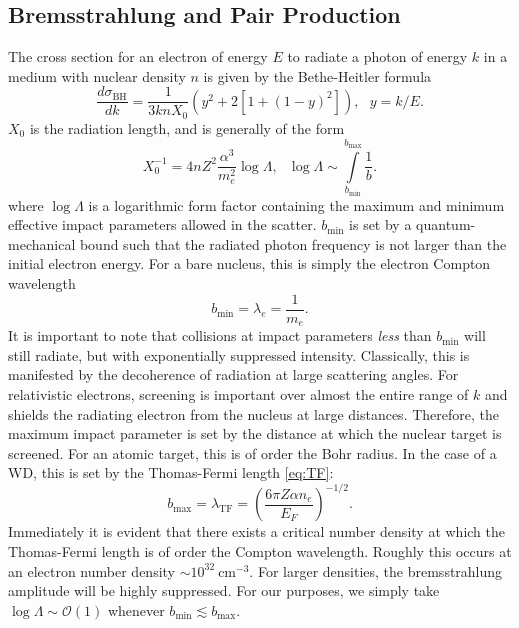 \documentclass[twocolumn,showpacs,preprintnumbers,amsmath,amssymb,prd]{revtex4}
\newcommand{\OO}{\mathcal{O}}
\def\r{\right)}
\def\l{\left(}
\begin{document}
\begin{appendices}
\subsection*{Bremsstrahlung and Pair Production}
The cross section for an electron of energy $E$ to radiate a photon of energy $k$ in a medium with nuclear density $n$ is given by the Bethe-Heitler formula
\begin{equation}
\label{eq:BH}
\frac{d \sigma_\text{BH}}{dk} = \frac{1}{3 k n X_0} (y^2+2 [1+ (1-y)^2]), ~~~ y = k/E.
\end{equation}
$X_0$ is the radiation length, and is generally of the form
\begin{equation}
X_0^{-1} = 4 n Z^2 \frac{\alpha^3}{m_e^2} \log{\Lambda}, ~~~ \log{\Lambda} \sim \int \limits_{b_\text{min}}^{b_\text{max}} \frac{1}{b}. 
\end{equation}
where $\log{\Lambda}$ is a logarithmic form factor containing the maximum and minimum effective impact parameters allowed in the scatter. $b_\text{min}$ is set by a quantum-mechanical bound such that the radiated photon frequency is not larger than the initial electron energy. For a bare nucleus, this is simply the electron Compton wavelength 
\begin{equation}
b_\text{min} = \lambda_e = \frac{1}{m_e}. 
\end{equation}
It is important to note that collisions at impact parameters \emph{less} than $b_\text{min}$ will still radiate, but with exponentially suppressed intensity. Classically, this is manifested by the decoherence of radiation at large scattering angles. For relativistic electrons, screening is important over almost the entire range of $k$ and shields the radiating electron from the nucleus at large distances. Therefore, the maximum impact parameter is set by the distance at which the nuclear target is screened. For an atomic target, this is of order the Bohr radius. In the case of a WD, this is set by the Thomas-Fermi length \eqref{eq:TF}:
\begin{equation}
b_\text{max} = \lambda_\text{TF} = \l \frac{6 \pi Z \alpha n_e}{E_F}\r^{-1/2}.
\end{equation}
Immediately it is evident that there exists a critical number density at which the Thomas-Fermi length is of order the Compton wavelength. Roughly this occurs at an electron number density $\sim 10^{32} ~\text{cm}^{-3}$. For larger densities, the bremsstrahlung amplitude will be highly suppressed. For our purposes, we simply take $\log{\Lambda} \sim \OO(1)$ whenever $b_\text{min} \lesssim b_\text{max}$. 


\end{appendices}
\end{document}
